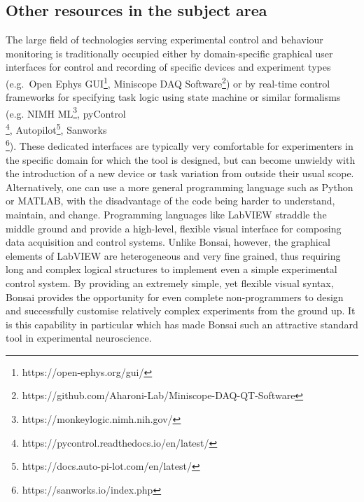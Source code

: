 \subsection*{Other resources in the subject area}

The large field of technologies serving experimental control and behaviour monitoring is traditionally occupied either by domain-specific graphical
user interfaces for control and recording of specific devices and experiment
types (e.g.\ Open Ephys
GUI\footnote{https://open-ephys.org/gui/},
Miniscope DAQ
Software\footnote{https://github.com/Aharoni-Lab/Miniscope-DAQ-QT-Software})
or by real-time control frameworks for specifying task logic using state
machine or similar formalisms (e.g. NIMH ML\footnote{https://monkeylogic.nimh.nih.gov/},
pyControl\\ \footnote{https://pycontrol.readthedocs.io/en/latest/},
Autopilot\footnote{https://docs.auto-pi-lot.com/en/latest/},
Sanworks\\ \footnote{https://sanworks.io/index.php}).
These dedicated interfaces are typically very comfortable for experimenters in the specific domain for which the tool is designed, but can become unwieldy with the introduction of a new device or task variation from outside their usual scope. Alternatively, one can use a more general programming language such as Python or MATLAB, with the disadvantage
of the code being harder to understand, maintain, and change. Programming
languages like LabVIEW straddle the middle ground and provide a high-level, flexible visual interface for composing data acquisition and control systems. Unlike Bonsai, however, the graphical elements of LabVIEW are
heterogeneous and very fine grained, thus requiring long and complex
logical structures to implement even a simple experimental control system. By providing an extremely simple, yet flexible visual syntax, Bonsai provides the
opportunity for even complete non-programmers to design and successfully
customise relatively complex experiments from the ground up. It is this
capability in particular which has made Bonsai such an attractive standard tool in
experimental neuroscience.


